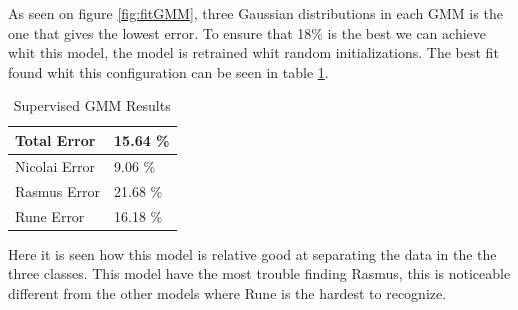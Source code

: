 As seen on figure \ref{fig:fitGMM}, three Gaussian distributions in each GMM is the one that gives the lowest error. To ensure that 18\% is the best we can achieve whit this model, the model is retrained whit random initializations. The best fit found whit this configuration can be seen in table \ref{tab:resultTableSGMM}.

\begin{table}[H]
\centering
\begin{tabular}{ll}
\hline
Total Error   & 15.64 \% \\ \hline
Nicolai Error & 9.06 \% \\
Rasmus Error  & 21.68 \% \\
Rune Error    & 16.18 \% \\ \hline
\end{tabular}
\caption{Supervised GMM Results}
\label{tab:resultTableSGMM}
\end{table}

Here it is seen how this model is relative good at separating the data in the  the three classes. This model have the most trouble finding Rasmus, this is noticeable different from the other models where Rune is the hardest to recognize. 

